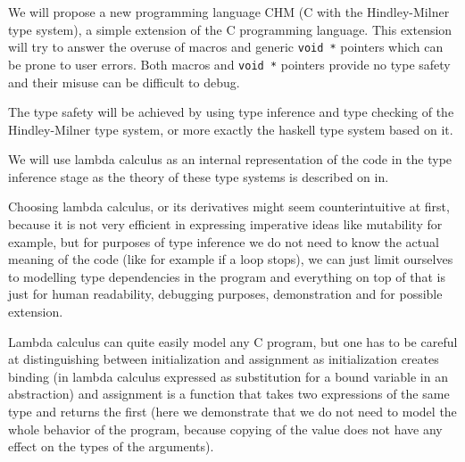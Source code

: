 

We will propose a new programming language CHM (C with the Hindley-Milner type system), a simple extension of the C programming language. This extension will try to answer the overuse of macros and generic \lstinline{void *} pointers which can be prone to user errors. Both macros and \lstinline{void *} pointers provide no type safety and their misuse can be difficult to debug.

The type safety will be achieved by using type inference and type checking of the Hindley-Milner type system, or more exactly the haskell type system based on it.

We will use lambda calculus as an internal representation of the code in the type inference stage as the theory of these type systems is described on in.

Choosing lambda calculus, or its derivatives might seem counterintuitive at first, because it is not very efficient in expressing imperative ideas like mutability for example, but for purposes of type inference we do not need to know the actual meaning of the code (like for example if a loop stops), we can just limit ourselves to modelling type dependencies in the program and everything on top of that is just for human readability, debugging purposes, demonstration and for possible extension.

Lambda calculus can quite easily model any C program, but one has to be careful at distinguishing between initialization and assignment as initialization creates binding (in lambda calculus expressed as substitution for a bound variable in an abstraction) and assignment is a function that takes two expressions of the same type and returns the first (here we demonstrate that we do not need to model the whole behavior of the program, because copying of the value does not have any effect on the types of the arguments).
